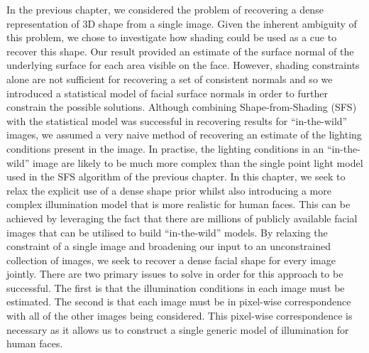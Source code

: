 In the previous chapter, we considered the problem of recovering a dense
representation of 3D shape from a single image. Given the inherent
ambiguity of this problem, we chose to investigate how shading could be used as
a cue to recover this shape. Our result provided an estimate of the surface
normal of the underlying surface for each area visible on the face. 
However, shading constraints alone are not
sufficient for recovering a set of consistent normals and so we introduced
a statistical model of facial surface normals in order to further constrain
the possible solutions. Although combining Shape-from-Shading (SFS) with the
statistical model was successful in recovering results for ``in-the-wild''
images, we assumed a very naive method of recovering an estimate of the
lighting conditions present in the image. In practise, the lighting conditions
in an ``in-the-wild'' image are likely to be much more complex than
the single point light model used in the SFS algorithm of the previous chapter.
In this chapter, we seek to relax the explicit use of a dense shape prior whilst
also introducing a more complex illumination model that is more realistic
for human faces. This can be achieved by leveraging the fact that there are
millions of publicly available facial images that can be utilised to build
``in-the-wild'' models. By relaxing the constraint of a single image and
broadening our input to an unconstrained collection of images, we seek
to recover a dense facial shape for every image jointly. There are two
primary issues to solve in order for this approach to be successful. The
first is that the illumination conditions in each image must be estimated.
The second is that each image must be in pixel-wise correspondence with all of
the other images being considered. This pixel-wise correspondence is necessary
as it allows us to construct a single generic model of illumination for human
faces.

\stopcontents[chapters]

